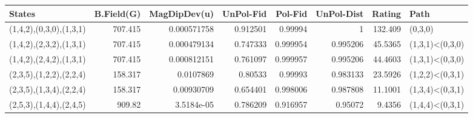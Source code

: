 \begin{tabular}{lrrrrrrl}
\hline
 States                  &   B.Field(G) &   MagDipDev(u) &   UnPol-Fid &   Pol-Fid &   UnPol-Dist &   Rating & Path            \\
\hline
 (1,4,2),(0,3,0),(1,3,1) &      707.415 &    0.000571758 &    0.912501 &  0.99994  &     1        & 132.409  & (0,3,0)         \\
 (1,4,2),(2,3,2),(1,3,1) &      707.415 &    0.000479134 &    0.747333 &  0.999954 &     0.995206 &  45.5365 & (1,3,1)<(0,3,0) \\
 (1,4,2),(2,4,2),(1,3,1) &      707.415 &    0.000812151 &    0.761097 &  0.999957 &     0.995206 &  44.4603 & (1,3,1)<(0,3,0) \\
 (2,3,5),(1,2,2),(2,2,4) &      158.317 &    0.0107869   &    0.80533  &  0.99993  &     0.983133 &  23.5926 & (1,2,2)<(0,3,1) \\
 (2,3,5),(1,3,4),(2,2,4) &      158.317 &    0.00930709  &    0.654401 &  0.998006 &     0.987808 &  11.1001 & (1,3,4)<(0,3,1) \\
 (2,5,3),(1,4,4),(2,4,5) &      909.82  &    3.5184e-05  &    0.786209 &  0.916957 &     0.95072  &   9.4356 & (1,4,4)<(0,3,1) \\
\hline
\end{tabular}
